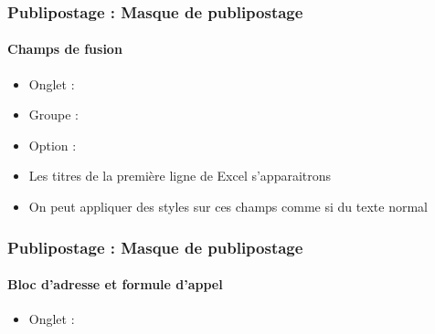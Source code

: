 \documentclass[xcolor=table]{beamer}
\begin{document}
\begin{frame}
\frametitle{Publipostage : Masque de publipostage}
\framesubtitle{Champs de fusion}

\begin{minipage}{0.63\textwidth}
	\begin{itemize}
		\item Onglet : 
		\item Groupe : 
		\item Option : 
		\item Les titres de la première ligne de Excel s'apparaitrons 
		\item On peut appliquer des styles sur ces champs comme si du texte normal
	\end{itemize}
\end{minipage}
\begin{minipage}{0.36\textwidth}
	
\end{minipage}

\end{frame}

\begin{frame}
\frametitle{Publipostage : Masque de publipostage}
\framesubtitle{Bloc d'adresse et formule d'appel}

\begin{minipage}{0.63\textwidth}
	\begin{itemize}
		\item Onglet : 
	\end{itemize}
\end{minipage}
\begin{minipage}{0.36\textwidth}
	
\end{minipage}

\end{frame}
\end{document}
